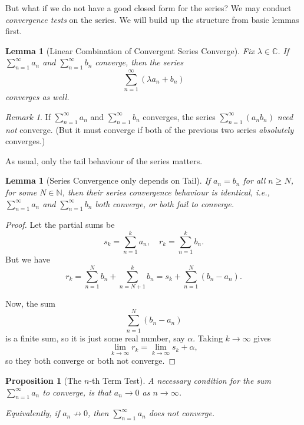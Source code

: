 \documentclass[11pt]{article}
\numberwithin{equation}{section}
\newtheorem{lemma}[theorem]{Lemma}
\newtheorem{proposition}[theorem]{Proposition}
\theoremstyle{definition}
\theoremstyle{remark}
\newtheorem{remark}[theorem]{Remark}
\newcommand{\pqty}[1]{\left(#1\right)}
\newcommand{\CC}{\mathbb C}
\newcommand{\NN}{\mathbb N}
\newcommand{\notto}{\not\to}
\begin{document}
But what if we do not have a good closed form for the series? We may conduct \emph{convergence tests} on the series. We will build up the structure from basic lemmas first.

\begin{lemma}[Linear Combination of Convergent Series Converge]\label{analysis-unit-0032}
    \label{lem:seq-linear-combination-series}%
    Fix \(\lambda \in \CC\). If \(\sum_{n = 1}^{\infty} a_n\) and \(\sum_{n = 1}^{\infty} b_n\) converge, then the series
    \[
        \sum_{n = 1}^{\infty} \pqty{\lambda a_n + b_n}
    \]
    converges as well.
\end{lemma}

\begin{remark}\label{analysis-unit-0033}
    If \(\sum_{n = 1}^{\infty} a_n\) and \(\sum_{n = 1}^{\infty} b_n\) converges, the series \(\sum_{n = 1}^{\infty} \pqty{a_n b_n}\) \emph{need not} converge. (But it must converge if both of the previous two series \textit{absolutely} converges.)
\end{remark}

As usual, only the tail behaviour of the series matters.

\begin{lemma}[Series Convergence only depends on Tail]\label{analysis-unit-0034}
    \label{lem:seq-series-convergence-tail}%
    If \(a_n = b_n\) for all \(n \geq N\), for some \(N \in \NN\), then their series convergence behaviour is identical, i.e., \(\sum_{n = 1}^{\infty} a_n\) and \(\sum_{n = 1}^{\infty} b_n\) both converge, or both fail to converge.
\end{lemma}

\begin{proof}
    Let the partial sums be
    \[
        s_k = \sum_{n = 1}^{k} a_n, \quad r_k = \sum_{n = 1}^{k} b_n.
    \]
    But we have
    \[
        r_k = \sum_{n = 1}^{N} b_n + \sum_{n = N + 1}^{k} b_n = s_{k} + \sum_{n = 1}^{N} \pqty{b_n - a_n}.
    \]

    Now, the sum
    \[
        \sum_{n = 1}^{N} \pqty{b_n - a_n}
    \]
    is a finite sum, so it is just some real number, say \(\alpha\). Taking \(k \to \infty\) gives
    \[
        \lim_{k \to \infty} r_k = \lim_{k \to \infty} s_k + \alpha,
    \]
    so they both converge or both not converge.
\end{proof}

\begin{proposition}[The \(n\)-th Term Test]\label{analysis-unit-0035}
    \label{prop:ser-test-nth-term}%
    A necessary condition for the sum \(\sum_{n = 1}^{\infty} a_n\) to  converge, is that \(a_n \to 0\) as \(n \to \infty\).

    Equivalently, if \(a_n \notto 0\), then \(\sum_{n = 1}^{\infty} a_n\) does not converge.
\end{proposition}
\end{document}

